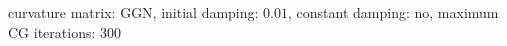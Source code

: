curvature matrix: $\text{GGN}$, initial damping: $\num[scientific-notation=true]{0.01}$, constant damping: $\text{no}$, maximum CG iterations: $\num[scientific-notation=false]{300}$